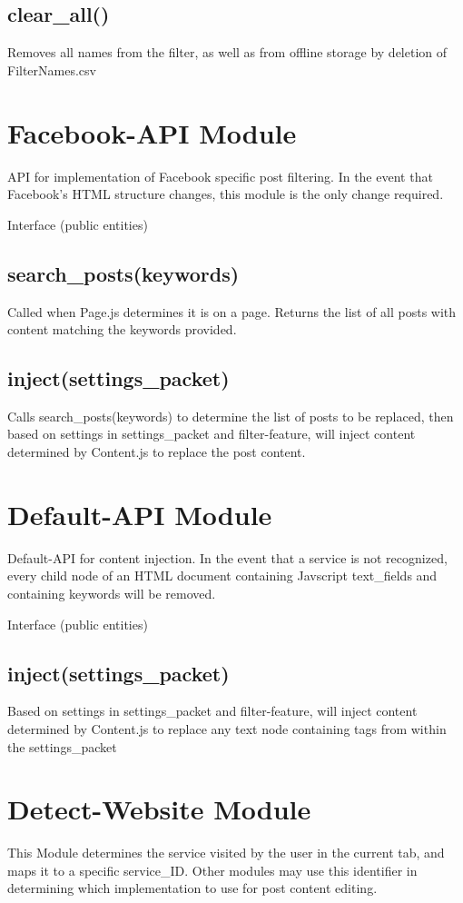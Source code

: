 \documentclass[12pt, titlepage]{article}
\begin{document}
\subsection{clear\_all()}
Removes all names from the filter, as well as from offline storage by deletion of FilterNames.csv

\section{Facebook-API Module}
API for implementation of Facebook specific post filtering. In the event that Facebook's HTML structure changes, this module is the only change required.

Interface (public entities)
\subsection{search\_posts(keywords)}
Called when Page.js determines it is on a page. Returns the list of all posts with content matching the keywords provided.
\subsection{inject(settings\_packet)}
Calls search\_posts(keywords) to determine the list of posts to be replaced, then based on settings in settings\_packet and filter-feature, will inject content determined by Content.js to replace the post content.

\section{Default-API Module}
Default-API for content injection. In the event that a service is not recognized, every child node of an HTML document containing Javscript text\_fields and containing keywords will be removed.

Interface (public entities)
\subsection{inject(settings\_packet)}
Based on settings in settings\_packet and filter-feature, will inject content determined by Content.js to replace any text node containing tags from within the settings\_packet

\section{Detect-Website Module}
This Module determines the service visited by the user in the current tab, and maps it to a specific service\_ID. Other modules may use this identifier in determining which implementation to use for post content editing.
\end{document}
